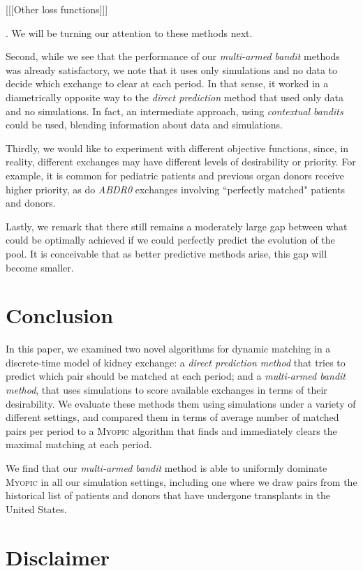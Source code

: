 [[[Other loss functions]]]

. We will be turning our attention to these methods next.

Second, while we see that the performance of our \emph{multi-armed bandit} methods was already satisfactory, we note that it uses only simulations and no data to decide which exchange to clear at each period. In that sense, it worked in a diametrically opposite way to the \emph{direct prediction} method that used only data and no simulations. In fact, an intermediate approach, using \emph{contextual bandits} \citep{lattimore2018bandits} could be used, blending information about data and simulations.

Thirdly, we would like to experiment with different objective functions, since, in reality, different exchanges may have different levels of desirability or priority. For example, it is common for pediatric patients and previous organ donors receive higher priority, as do \emph{ABDR0} exchanges involving ``perfectly matched" patients and donors.

Lastly, we remark that there still remains a moderately large gap between what could be optimally achieved if we could perfectly predict the evolution of the pool. It is conceivable that as better predictive methods arise, this gap will become smaller. 


\section{Conclusion}

In this paper, we examined two novel algorithms for dynamic matching in a discrete-time model of kidney exchange: a \emph{direct prediction method} that tries to predict which pair should be matched at each period; and a \emph{multi-armed bandit method}, that uses simulations to score available exchanges in terms of their desirability. We evaluate these methods them using simulations under a variety of different settings, and compared them in terms of average number of matched pairs per period to a \textsc{Myopic} algorithm that finds and immediately clears the maximal matching at each period.
  
We find that our \emph{multi-armed bandit} method is able to uniformly dominate \textsc{Myopic} in all our simulation settings, including one where we draw pairs from the historical list of patients and donors that have undergone transplants in the United States.

\section*{Disclaimer}

